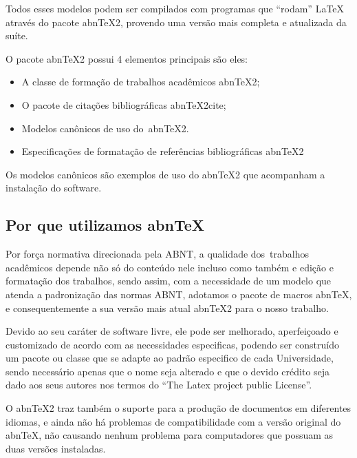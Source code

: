 \bigskip

{
Todos esses modelos podem ser compilados com programas que ``rodam'' {\LaTeX} atrav\'es do pacote abnTeX2, provendo uma
vers\~ao mais completa e atualizada da su\'ite.}

{
O pacote abnTeX2 possui 4 elementos principais s\~ao eles:}

\liststyleLFOv
\begin{itemize}
\item {
A classe de forma\c{c}\~ao de trabalhos acad\^emicos abnTeX2;}
\item {
O pacote de cita\c{c}\~oes bibliogr\'aficas abnTeX2cite;}
\item {
Modelos can\^onicos de uso do\ abnTeX2.}
\item {
Especifica\c{c}\~oes de formata\c{c}\~ao de refer\^encias bibliogr\'aficas abnTeX2}
\end{itemize}
{
Os modelos can\^onicos s\~ao exemplos de uso do abnTeX2 que acompanham a instala\c{c}\~ao do software.}


\bigskip

\subsection[Por que utilizamos abnTeX]{ Por que utilizamos abnTeX}

\bigskip

{
Por for\c{c}a normativa direcionada pela ABNT, a qualidade dos\ trabalhos acad\^emicos depende n\~ao s\'o do conte\'udo
nele incluso como tamb\'em e edi\c{c}\~ao e formata\c{c}\~ao dos trabalhos, sendo assim, com a necessidade de um modelo
que atenda a padroniza\c{c}\~ao das normas ABNT, adotamos o pacote de macros abnTeX, e consequentemente a sua vers\~ao
mais atual abnTeX2 para o nosso trabalho.}

{
Devido ao seu car\'ater de software livre, ele pode ser melhorado, aperfei\c{c}oado e customizado de acordo com as
necessidades especificas, podendo ser constru\'ido um pacote ou classe que se adapte ao padr\~ao especifico de cada
Universidade, sendo necess\'ario apenas que o nome seja alterado e que o devido cr\'edito seja dado aos seus autores
nos termos do ``The Latex project public License''.}

{
O abnTeX2 traz tamb\'em o suporte para a produ\c{c}\~ao de documentos em diferentes idiomas, e ainda n\~ao h\'a
problemas de compatibilidade com a vers\~ao original do abnTeX, n\~ao causando nenhum problema para computadores que
possuam as duas vers\~oes instaladas.}



